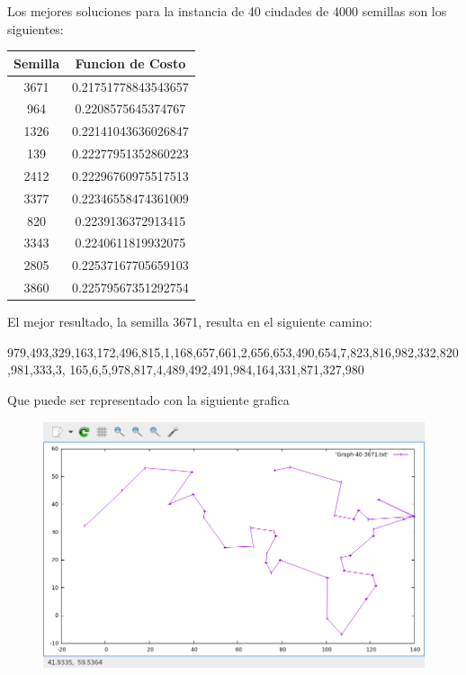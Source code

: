 \documentclass{article}
\begin{document}
    Los mejores soluciones para la instancia de 40 ciudades de 4000 semillas son los siguientes:
    \begin{center}
        \begin{tabular}{ |c | c |} 
             \hline
             Semilla & Funcion de Costo \\
             \hline
             3671 & 0.21751778843543657 \\ 
             964 & 0.2208575645374767 \\ 
             1326 & 0.22141043636026847\\ 
             139 & 0.22277951352860223\\ 
             2412 & 0.22296760975517513\\  
             3377 & 0.22346558474361009\\  
             820 & 0.2239136372913415\\  
             3343 & 0.2240611819932075\\  
             2805 & 0.22537167705659103\\  
             3860 & 0.22579567351292754\\  
             \hline
        \end{tabular}
    \end{center}
    El mejor resultado, la semilla 3671, resulta en el siguiente camino: \\
    \begin{center}
        979,493,329,163,172,496,815,1,168,657,661,2,656,653,490,654,7,823,816,982,332,820,981,333,3,
        165,6,5,978,817,4,489,492,491,984,164,331,871,327,980
    \end{center}
    Que puede ser representado con la siguiente grafica\\
    \begin{figure}[h]
        \centering
        \includegraphics[scale=.60]{Graph40.png}
    \end{figure}\\
\end{document}
